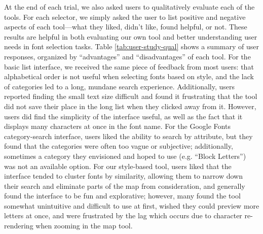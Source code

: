 At the end of each trial, we also asked users to qualitatively evaluate each of the tools. For each selector, we simply asked the user to list positive and negative aspects of each tool---what they liked, didn't like, found helpful, or not. These results are helpful in both evaluating our own tool and better understanding user needs in font selection tasks. Table \ref{tab:user-study-qual} shows a summary of user responses, organized by ``advantages'' and ``disadvantages'' of each tool. For the basic list interface, we received the same piece of feedback from most users: that alphabetical order is not useful when selecting fonts based on style, and the lack of categories led to a long, mundane search experience. Additionally, users reported finding the small text size difficult and found it frustrating that the tool did not save their place in the long list when they clicked away from it. However, users did find the simplicity of the interface useful, as well as the fact that it displays many characters at once in the font name. For the Google Fonts category-search interface, users liked the ability to search by attribute, but they found that the categories were often too vague or subjective; additionally, sometimes a category they envisioned and hoped to use (e.g. ``Block Letters'') was not an available option. For our style-based tool, users liked that the interface tended to cluster fonts by similarity, allowing them to narrow down their search and eliminate parts of the map from consideration, and generally found the interface to be fun and explorative; however, many found the tool somewhat unintuitive and difficult to use at first, wished they could preview more letters at once, and were frustrated by the lag which occurs due to character re-rendering when zooming in the map tool.

